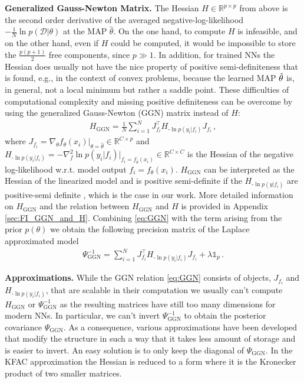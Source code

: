 \textbf{Generalized Gauss-Newton Matrix.}
The Hessian $H \in \mathbb{R}^{p \times p}$ from above is the second order derivative of the averaged negative-log-likelihood $-\frac{1}{N}\ln p(\mathcal{D}|\theta)$ at the MAP $\hat{\theta}$. On the one hand, to compute $H$ is infeasible, and on the other hand, even if $H$ could be computed, it would be impossible to store the $\frac{p \left(p+1\right)}{2}$ free components, since $p\gg 1$.
In addition, for trained NNs the Hessian does usually not have the nice property of positive semi-definiteness that is found, e.g., in the context of convex problems, because the learned MAP $\hat{\theta}$ is, in general, not a local minimum but rather a saddle point. 
These difficulties of computational complexity and missing positive definiteness can be overcome by using the generalized Gauss-Newton (GGN) matrix \cite{Schraudolph2002} instead of $H$:
\begin{align}
    \label{eq:GGN}
    H_{\mathrm{GGN}} = \frac{1}{N} \sum_{i=1}^N J^\intercal_{f_i} H_{\text{-}\ln p(y_i|f_i)} J_{f_i}\,,
    \end{align}
where $J_{f_i} = \nabla_{\theta} f_{\theta}(x_i)\vert_{\theta=\hat{\theta}} \in \mathbb{R}^{C \times p}$ and $H_{\text{-}\ln p(y_i|f_i)} = - \nabla_{f}^2 \ln p(y_i|f_i)\vert_{f_i=f_{\hat{\theta}}(x_i)} \in  \mathbb{R}^{C \times C}$ is the Hessian of the negative log-likelihood w.r.t. model output ${f_i} = f_{\theta}(x_i)$. $H_{\mathrm{GGN}}$ can be interpreted as the Hessian of the linearized model \cite{Martens14, Immer2021} and is positive semi-definite if the $H_{\text{-}\ln p(y|f_i)}$ are positive-semi definite \cite{Schraudolph2002}, which is the case in our work. More detailed  information on $H_{\mathrm{GGN}}$ and the relation between $H_{\mathrm{GGN}}$ and $H$ is provided in Appendix \ref{sec:FI_GGN_and_H}.
Combining \eqref{eq:GGN} with the term arising from the prior $p(\theta)$ we obtain the following precision matrix of the Laplace approximated model
\begin{align}
    \label{eq:IPsiGGN}
    \Psi_{\mathrm{GGN}}^{-1}=  \sum_{i=1}^N J^\intercal_{f_i} H_{\text{-}\ln p(y_i|f_i)} J_{f_i} + \lambda \mathbb{1}_p\,.
\end{align}

\textbf{Approximations.}
While the GGN relation \eqref{eq:GGN} consists of objects, $J_{f_i}$ and $H_{\text{-}\ln p(y_i|f_i)}$, that are scalable in their computation we usually can't compute $H_{\mathrm{GGN}}$ or $\Psi_{\mathrm{GGN}}^{-1}$ as the resulting matrices have still too many dimensions for modern NNs. In particular, we can't invert $\Psi_{\mathrm{GGN}}^{-1}$ to obtain the posterior covariance
$\Psi_{\mathrm{GGN}}$.
As a consequence, various approximations have been developed that modify the structure in such a way that it takes less amount of storage and is easier to invert. An easy solution is to only keep the diagonal of $\Psi_{\mathrm{GGN}}$. In the KFAC approximation the Hessian is reduced to a form where it is the Kronecker product of two smaller matrices. 

